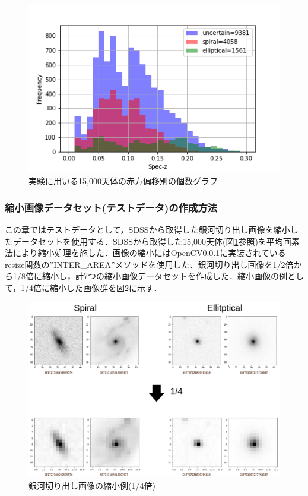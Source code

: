 \documentclass[a4j, 11pt]{jreport}
\begin{document}
\begin{figure}[h]
 \centering
 \includegraphics[width=14cm]{images/z_15000_4.png}
 \caption{実験に用いる15,000天体の赤方偏移別の個数グラフ}
 \label{fig:z_15000_2}
\end{figure}

\subsubsection{縮小画像データセット(テストデータ)の作成方法}
この章ではテストデータとして，SDSSから取得した銀河切り出し画像を縮小したデータセットを使用する．SDSSから取得した15,000天体(図\ref{fig:z_15000_2}参照)を平均画素法により縮小処理を施した．画像の縮小にはOpenCV\ref{}に実装されているresize関数の''INTER\_AREA''メソッドを使用した．銀河切り出し画像を1/2倍から1/8倍に縮小し，計7つの縮小画像データセットを作成した．縮小画像の例として，1/4倍に縮小した画像群を図\ref{fig:shrink_1_4}に示す．

\begin{figure}
 \centering
 \includegraphics[width=13cm]{images/5syou/syuron_5syou_kakudai/ver1/5syou_shrink_ver1.png}
 \caption{銀河切り出し画像の縮小例(1/4倍)}
 \label{fig:shrink_1_4}
\end{figure}
\end{document}

